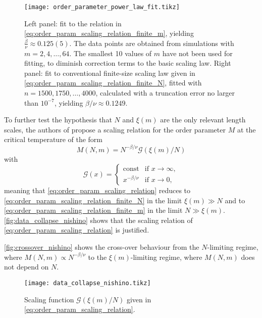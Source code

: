 \begin{figure}
  \texttt{[image: order\_parameter\_power\_law\_fit.tikz]}
  \caption{Left panel: fit to the relation in
  \autoref{eq:order_param_scaling_relation_finite_m}, yielding $\frac{\beta}{\nu} \approx
  0.125(5)$. The data points are obtained from simulations with $m = 2, 4, \dots, 64$. The
  smallest 10 values of $m$ have not been used for fitting, to diminish correction terms
  to the basic scaling law. Right panel: fit to conventional finite-size scaling law
  given in \autoref{eq:order_param_scaling_relation_finite_N}, fitted with $n = 1500, 1750, \dots, 4000$, calculated with a truncation error no larger than $10^{-7}$, yielding $\beta/\nu \approx 0.1249$.
  }
  \label{fig:order_parameter_power_law_fit}
\end{figure}

To further test the hypothesis that $N$ and $\xi(m)$ are the only relevant length scales,
the authors of \cite{nishino1996numerical} propose a scaling relation for the order
parameter $M$ at the critical temperature of the form
\begin{equation}\label{eq:order_param_scaling_relation}
  M(N, m) = N^{-\beta/\nu} \mathcal{G}(\xi(m) / N)
\end{equation}
with
\begin{equation}
  \mathcal{G}(x) =
  \begin{cases}
    \text{const} & \text{if } x \to \infty, \\
    x^{-\beta/\nu} & \text{if } x \to 0,
  \end{cases}
\end{equation}
meaning that \autoref{eq:order_param_scaling_relation} reduces to
\autoref{eq:order_param_scaling_relation_finite_N} in the limit $\xi(m) \gg N$ and to
\autoref{eq:order_param_scaling_relation_finite_m} in the limit $N \gg \xi(m)$.
\autoref{fig:data_collapse_nishino} shows that the scaling relation of \autoref{eq:order_param_scaling_relation}
is justified.

\autoref{fig:crossover_nishino} shows the cross-over behaviour from the $N$-limiting regime, where
$M(N, m) \propto N^{-\beta/\nu}$ to the $\xi(m)$-limiting regime, where $M(N, m)$ does not depend on $N$.

\begin{figure}
  \texttt{[image: data\_collapse\_nishino.tikz]}
  \caption{Scaling function $\mathcal{G}(\xi(m)/N)$ given in
  \autoref{eq:order_param_scaling_relation}.}\label{fig:data_collapse_nishino}
\end{figure}

